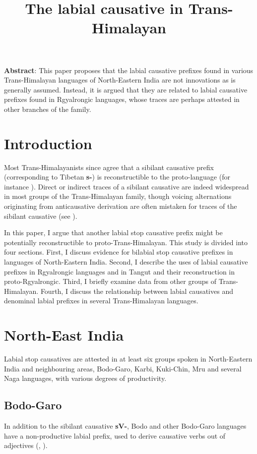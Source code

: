 \documentclass[oneside,a4paper,11pt]{article}
\newcommand{\ipa}[1]{\textbf{{\phon\mbox{#1}}}} %
\begin{document}
\title{The labial causative in Trans-Himalayan}
\maketitle
\sloppy
\textbf{Abstract}: This paper proposes that the labial causative prefixes found in various Trans-Himalayan languages of North-Eastern India are not innovations as is generally assumed. Instead, it is argued that they are related to labial causative prefixes found in Rgyalrongic languages, whose traces are perhaps attested in other branches of the family.

\section{Introduction}
Most Trans-Himalayanists since \citet{conrady1896} agree that a sibilant causative prefix (corresponding to Tibetan \ipa{s-}) is reconstructible to the proto-language (for instance \citealt{wolfenden29outlines, matisoff03}). Direct or indirect traces of a sibilant causative are indeed widespread in most groups of the Trans-Himalayan family, though voicing alternations originating from anticausative derivation are often mistaken for traces of the sibilant causative (see \citealt{jacques15causative}).

In this paper, I argue that another labial stop causative prefix might be potentially reconstructible to proto-Trans-Himalayan. This study is divided into four sections. First,  I discuss evidence for bilabial stop causative prefixes in languages of North-Eastern India. Second, I describe the uses of labial causative prefixes in Rgyalrongic languages and in Tangut and their reconstruction in proto-Rgyalrongic. Third, I briefly examine data from other groups of Trans-Himalayan. Fourth, I discuss the relationship between labial causatives and denominal labial prefixes in several Trans-Himalayan languages.

\section{North-East India}
Labial stop causatives are attested in at least six groups spoken in North-Eastern India and neighbouring areas, Bodo-Garo, Karbi, Kuki-Chin, Mru and several Naga languages, with various degrees of productivity.

\subsection{Bodo-Garo}
In addition to the sibilant causative \ipa{sV-}, Bodo and other Bodo-Garo languages have a non-productive labial prefix, used to derive causative verbs out of adjectives (\citealt[90]{mazo04st}, \citealt{delancey15adjectival}).
\end{document}
